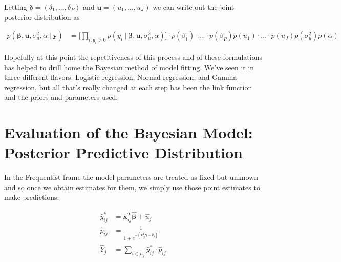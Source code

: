 \documentclass[12pt,twoside]{reedthesis}
\begin{document}
Letting \(\boldsymbol{\delta} = (\delta_1, ..., \delta_P)\) and \(\mathbf{u} = (u_1, ..., u_J)\) we can write out the joint posterior distribution as

\[
\begin{aligned}
p(\boldsymbol{\beta}, \mathbf{u}, \sigma_{u}^2, \alpha \ | \ \mathbf{y}) &=\bigg[\prod_{i:y_{i} > 0}p(y_{i} \ | \ \boldsymbol{\beta},\mathbf{u}, \sigma_{u}^2, \alpha)\bigg]\cdot p(\beta_1)\cdot...\cdot p(\beta_P)p(u_1)\cdot ... \cdot p(u_J)p(\sigma_{u}^2)p( \alpha) 
\end{aligned}
\]

Hopefully at this point the repetitiveness of this process and of these formulations has helped to drill home the Bayesian method of model fitting. We've seen it in three different flavors: Logistic regression, Normal regression, and Gamma regression, but all that's really changed at each step has been the link function and the priors and parameters used.

\hypertarget{bayespred}{%
\section{Evaluation of the Bayesian Model: Posterior Predictive Distribution}\label{bayespred}}

In the Frequentist frame the model parameters are treated as fixed but unknown and so once we obtain estimates for them, we simply use those point estimates to make predictions.

\[
\begin{aligned}
\hat{y}^*_{ij} &= \mathbf{x}_{ij}^T\hat{\boldsymbol{\beta}} + \hat{u}_j \\
\hat{p}_{ij} &= \frac{1}{1 + e^{-(\mathbf{x}_{ij}^T\hat{\boldsymbol{\gamma}} + \hat{v}_j)}} \\
\hat{Y}_{j} &= \sum_{i\in n_j}\hat{y}^*_{ij}\cdot \hat{p}_{ij} 
\end{aligned}
\]
\end{document}

